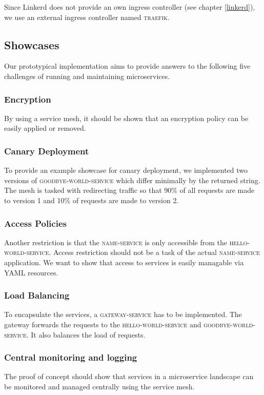 Since Linkerd does not provide an own ingress controller (see chapter \ref{linkerd}), we use an external ingress controller named \textsc{traefik}.

\subsection{Showcases}
\label{sec:showcases-1}

Our prototypical implementation aims to provide answers to the following five challenges of running and maintaining microservices.

\subsubsection{Encryption}

By using a service mesh, it should be shown that an encryption policy can be easily applied or removed.

\subsubsection{Canary Deployment}

To provide an example showcase for canary deployment, we implemented two versions of \textsc{goodbye-world-service} which differ minimally by the returned string. The mesh is tasked with redirecting traffic so that 90\% of all requests are made to version 1 and 10\% of requests are made to version 2.

\subsubsection{Access Policies}

Another restriction is that the \textsc{name-service} is only accessible from the \textsc{hello-world-service}. Access restriction should not be a task of the actual \textsc{name-service} application. We want to show that access to services is easily managable via YAML resources.

\subsubsection{Load Balancing}
To encapsulate the services, a \textsc{gateway-service} has to be implemented. The gateway forwards the requests to the \textsc{hello-world-service} and \textsc{goodbye-world-service}. It also balances the load of requests.

\subsubsection{Central monitoring and logging}
The proof of concept should show that services in a microservice landscape can be monitored and managed centrally using the service mesh.

